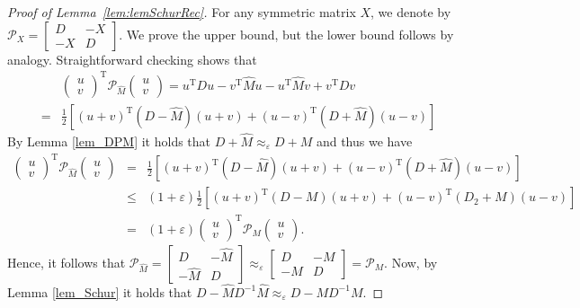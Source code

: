 \documentclass[11pt]{article}
\newcommand{\hM}{\widehat{M}}
\newcommand{\Di}{D^{-1}}
\newcommand{\rot}{\mathrm{T}}
\newcommand{\eps}{\epsilon}
\renewcommand{\leq}{\leqslant}
\newcommand{\lemref}[1]{Lemma~\ref{lem:#1}}
\renewcommand{\eps}{\varepsilon}
\numberwithin{thm}{section}
\begin{document}
\begin{proof}[Proof of \lemref{lemSchurRec}] For any symmetric matrix $X$, we denote
by $\mathcal{P}_{X}=\left[\begin{array}{cc}
D & -X\\
-X & D
\end{array}\right]$. We prove the upper bound, but the lower bound follows by analogy.
Straightforward checking shows that
\begin{eqnarray*}
 &  & \left(\begin{array}{c}
u\\
v
\end{array}\right)^{\rot}\mathcal{P}_{\hM }\left(\begin{array}{c}
u\\
v
\end{array}\right)=u^{\rot}Du-v^{\rot}\hM u-u^{\rot}\hM v+v^{\rot}Dv\\
 & = & \frac{1}{2}\left[(u+v)^{\rot}(D-\hM )(u+v)+(u-v)^{\rot}(D+\hM )(u-v)\right]
\end{eqnarray*}
By Lemma \ref{lem_DPM} it holds that $D+\hM \approx_{\eps}D+M$
and thus we have
\begin{eqnarray*}
\left(\begin{array}{c}
u\\
v
\end{array}\right)^{\rot}\mathcal{P}_{\hM}\left(\begin{array}{c}
u\\
v
\end{array}\right)&=&\frac{1}{2}\left[(u+v)^{\rot}(D-\hM)(u+v)+(u-v)^{\rot}(D+\hM)(u-v)\right]\\&\leq&(1+\eps)\frac{1}{2}\left[(u+v)^{\rot}(D-M)(u+v)+(u-v)^{\rot}(D_{2}+M)(u-v)\right]\\&=&(1+\eps)\left(\begin{array}{c}
u\\
v
\end{array}\right)^{\rot}\mathcal{P}_{M}\left(\begin{array}{c}
u\\
v
\end{array}\right).
\end{eqnarray*}
Hence, it follows that $\mathcal{P}_{\hM }=\left[\begin{array}{cc}
D & -\hM \\
-\hM  & D
\end{array}\right]\approx_{\eps}\left[\begin{array}{cc}
D & -M\\
-M & D
\end{array}\right]=\mathcal{P}_{M}$. Now, by Lemma \ref{lem_Schur} it holds that $D-\hM \Di \hM \approx_{\eps}D-M\Di M$.
\end{proof}
\end{document}
